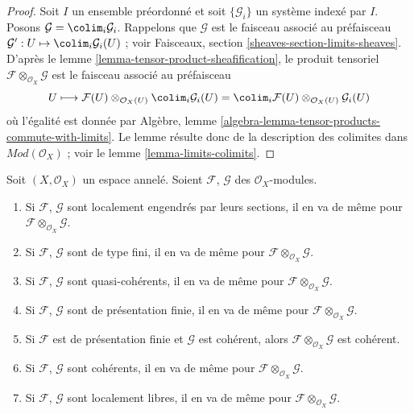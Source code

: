 \begin{proof}
Soit $I$ un ensemble préordonné et soit $\{\mathcal{G}_i\}$
un système indexé par $I$. Posons $\mathcal{G} = \colim_i \mathcal{G}_i$.
Rappelons que $\mathcal{G}$ est le faisceau associé au préfaisceau
$\mathcal{G}' : U \mapsto \colim_i \mathcal{G}_i(U)$ ; voir
Faisceaux, section \ref{sheaves-section-limits-sheaves}.
D'après le
lemme \ref{lemma-tensor-product-sheafification},
le produit tensoriel $\mathcal{F} \otimes_{\mathcal{O}_X} \mathcal{G}$
est le faisceau associé au préfaisceau
$$
U \longmapsto
\mathcal{F}(U) \otimes_{\mathcal{O}_X(U)} \colim_i \mathcal{G}_i(U) =
\colim_i \mathcal{F}(U) \otimes_{\mathcal{O}_X(U)} \mathcal{G}_i(U)
$$
où l'égalité est donnée par
Algèbre, lemme \ref{algebra-lemma-tensor-products-commute-with-limits}.
Le lemme résulte donc de la description des colimites dans
$\textit{Mod}(\mathcal{O}_X)$ ; voir le lemme \ref{lemma-limits-colimits}.
\end{proof}

\begin{lemma}
\label{lemma-tensor-product-permanence}
Soit $(X, \mathcal{O}_X)$ un espace annelé.
Soient $\mathcal{F}$, $\mathcal{G}$ des $\mathcal{O}_X$-modules.
\begin{enumerate}
\item Si $\mathcal{F}$, $\mathcal{G}$ sont localement engendrés
par leurs sections, il en va de même pour $\mathcal{F} \otimes_{\mathcal{O}_X} \mathcal{G}$.
\item Si $\mathcal{F}$, $\mathcal{G}$ sont de type fini,
il en va de même pour $\mathcal{F} \otimes_{\mathcal{O}_X} \mathcal{G}$.
\item Si $\mathcal{F}$, $\mathcal{G}$ sont quasi-cohérents,
il en va de même pour $\mathcal{F} \otimes_{\mathcal{O}_X} \mathcal{G}$.
\item Si $\mathcal{F}$, $\mathcal{G}$ sont de présentation finie,
il en va de même pour $\mathcal{F} \otimes_{\mathcal{O}_X} \mathcal{G}$.
\item Si $\mathcal{F}$ est de présentation finie et $\mathcal{G}$ est cohérent,
alors $\mathcal{F} \otimes_{\mathcal{O}_X} \mathcal{G}$ est cohérent.
\item Si $\mathcal{F}$, $\mathcal{G}$ sont cohérents,
il en va de même pour $\mathcal{F} \otimes_{\mathcal{O}_X} \mathcal{G}$.
\item Si $\mathcal{F}$, $\mathcal{G}$ sont localement libres,
il en va de même pour $\mathcal{F} \otimes_{\mathcal{O}_X} \mathcal{G}$.
\end{enumerate}
\end{lemma}

